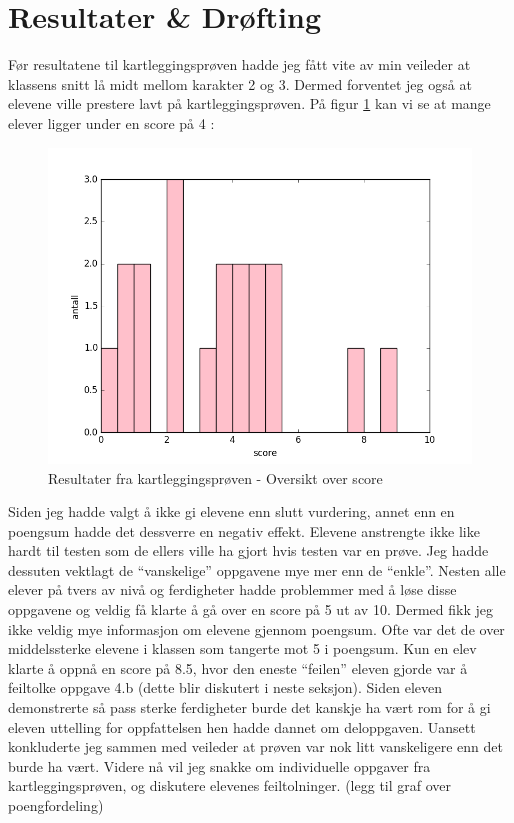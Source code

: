 \documentclass[main.tex]{subfiles}
\begin{document}
\section*{Resultater \& Drøfting}
\label{sec:4}

Før resultatene til kartleggingsprøven hadde jeg fått vite av min veileder at klassens snitt lå midt mellom
karakter 2 og 3. Dermed forventet jeg også at elevene ville prestere lavt på kartleggingsprøven. På figur 
\ref{fig:scoreoversikt} kan vi se at mange elever ligger under en score på 4 :
\begin{figure}[h!]
\centering
\includegraphics[scale = 0.5]{../figures/scoreoversikt.png}
\caption{Resultater fra kartleggingsprøven - Oversikt over score}
\label{fig:scoreoversikt}
\end{figure}

Siden jeg hadde valgt å ikke gi elevene enn slutt vurdering, annet enn en poengsum hadde det dessverre en negativ effekt. Elevene anstrengte ikke like hardt til testen som de ellers ville ha gjort hvis testen var en prøve.
 Jeg hadde dessuten vektlagt de ``vanskelige'' oppgavene mye mer enn de 
``enkle''. Nesten alle elever på tvers av nivå og ferdigheter hadde 
problemmer med å løse disse oppgavene og veldig få klarte å gå over en score på 5 ut av 10. Dermed fikk jeg ikke 
veldig mye informasjon om elevene gjennom poengsum. Ofte var det de over middelssterke elevene i klassen som tangerte
mot 5 i poengsum. Kun en elev klarte å oppnå en score på 8.5, hvor den eneste ``feilen'' eleven gjorde var å
feiltolke oppgave 4.b (dette blir diskutert i neste seksjon). Siden eleven demonstrerte så pass sterke ferdigheter 
burde det kanskje ha vært rom for å gi eleven uttelling for oppfattelsen hen hadde dannet om deloppgaven. 
Uansett konkluderte jeg sammen med veileder at prøven var nok litt vanskeligere enn det burde ha vært. Videre nå vil 
jeg snakke om individuelle oppgaver fra kartleggingsprøven, og diskutere elevenes feiltolninger.
(legg til graf over poengfordeling)
\end{document}
